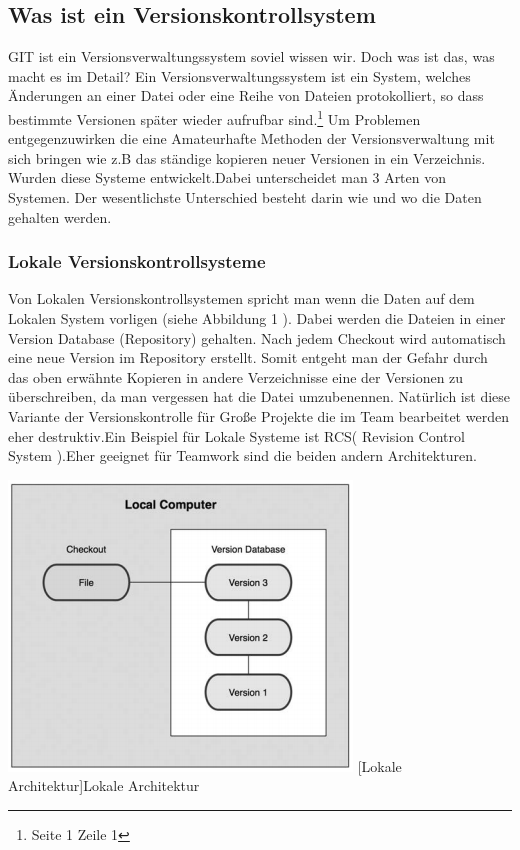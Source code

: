 \documentclass[12pt,a4paper,bibliography=totocnumbered,listof=totocnumbered]{scrartcl}
\begin{document}
\subsection{Was ist ein Versionskontrollsystem}
GIT ist ein Versionsverwaltungssystem soviel wissen wir. Doch was ist das, was macht es im Detail? Ein Versionsverwaltungssystem ist ein System, welches Änderungen an einer Datei oder eine Reihe von Dateien protokolliert, so dass  bestimmte Versionen später wieder aufrufbar sind.\footnote{\cite{chacon2009pro} Seite 1 Zeile 1 } Um Problemen entgegenzuwirken die eine Amateurhafte Methoden der Versionsverwaltung mit sich bringen wie z.B das ständige kopieren neuer Versionen in ein Verzeichnis. Wurden diese Systeme entwickelt.Dabei unterscheidet man 3 Arten von Systemen. Der wesentlichste Unterschied besteht darin wie und wo die Daten gehalten werden.
\subsubsection{Lokale Versionskontrollsysteme}

Von Lokalen Versionskontrollsystemen spricht man wenn die Daten auf dem Lokalen System vorligen (siehe Abbildung 1 ). Dabei werden die Dateien in einer Version Database (Repository) gehalten. Nach jedem Checkout wird automatisch eine neue Version im Repository erstellt. Somit entgeht man der Gefahr durch das oben erwähnte Kopieren in andere Verzeichnisse eine der Versionen zu überschreiben, da man vergessen hat die Datei umzubenennen. Natürlich ist diese Variante der Versionskontrolle für Große Projekte die im Team bearbeitet werden eher destruktiv.Ein Beispiel für Lokale Systeme ist RCS( Revision Control System ).Eher geeignet für Teamwork sind die beiden andern Architekturen. 
\newline
\vspace{3pt}
\begin{minipage}{\linewidth}
	\centering
	\includegraphics[width=0.4\linewidth]{Bilder/LVKS.png}
	[Lokale Architektur]{Lokale Architektur  \cite{chacon2009pro}\footnotemark }
	\label{fig:osgi}
\end{minipage}
\newpage
\end{document}

